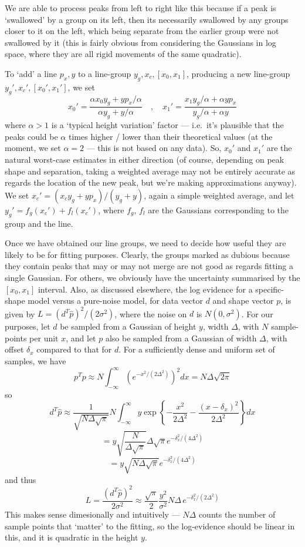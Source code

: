 We are able to process peaks from left to right like this because if
a peak is `swallowed' by a group on its left, then its necessarily
swallowed by any groups closer to it on the left, which being separate
from the earlier group were not swallowed by it (this is fairly obvious
from considering the Gaussians in log space, where they are all rigid
movements of the same quadratic).


To `add' a line $p_x, y$ to a line-group $y_g, x_c, [x_0, x_1]$, producing
a new line-group $y_g', x_c', [x_0', x_1']$, we set
\[
x_0' = \frac{\alpha x_0 y_g + y p_x / \alpha}{\alpha y_g + y/\alpha}
\quad , \quad
x_1' = \frac{x_1 y_g/\alpha + \alpha y p_x}{y_g/\alpha +\alpha y}
\]
where $\alpha > 1$ is a `typical height variation' factor --- i.e.\ it's
plausible that the peaks could be $\alpha$ times higher / lower than
their theoretical values (at the moment, we set $\alpha = 2$ --- this is
not based on any data). So, $x_0'$ and $x_1'$ are the natural worst-case
estimates in either direction (of course, depending on peak shape and separation,
taking a weighted average may not be entirely accurate as regards the location
of the new peak, but we're making approximations anyway).
We set $x_c' = (x_c y_g + y p_x)/(y_g + y)$, again a simple weighted average,
and let $y_g' = f_g (x_c') + f_l (x_c')$, where $f_g$, $f_l$ are the Gaussians
corresponding to the group and the line.


Once we have obtained our line groups, we need to decide how useful they are
likely to be for fitting purposes. Clearly, the groups marked as dubious
because they contain peaks that may or may not merge are not good as regards
fitting a single Gaussian. For others, we obviously have the uncertainty
summarised by the $[x_0, x_1]$ interval. Also, as discussed elsewhere,
the log evidence for a specific-shape model versus a pure-noise
model, for data vector $d$ and shape vector $p$, is given by $L = (d^T 
\hat p)^2 / (2 \sigma^2)$, where the noise on $d$ is $N(0, \sigma^2)$. 
For our purposes, let $d$ be sampled from a Gaussian of height $y$,
width $\Delta$, with $N$ sample-points per unit $x$,
and let $p$ also be sampled from a Gaussian of width $\Delta$, with
offset $\delta_x$ compared to that for $d$. 
For a sufficiently dense and uniform set of samples, we have 
\[
p^T p \approx N \int_{-\infty}^\infty \left(
e^{-x^2 / (2 \Delta^2)} \right)^2
 dx
= N \Delta \sqrt{2 \pi}
\]
so
\[
d^T \hat p \approx \frac{1}{\sqrt{N \Delta \sqrt{\pi}}} N
\int_{-\infty}^\infty
y \exp\left\{-\frac{x^2}{2 \Delta^2} - \frac{(x-\delta_x)^2}{2 \Delta^2}\right\} dx
\]
\[
= y \sqrt{\frac{N}{\Delta \sqrt{\pi}}} \Delta \sqrt\pi e^{-\delta_x^2 / (4 \Delta^2)}
\]
\[
= y \sqrt{N \Delta \sqrt\pi} e^{-\delta_x^2 / (4 \Delta^2)}
\]
and thus
\[
L = \frac{(d^T \hat p)^2}{2 \sigma^2} \approx 
\frac{\sqrt \pi}{2} \frac{y^2}{\sigma^2} N \Delta  \,
 e^{- \delta_x^2 / (2 \Delta^2)} 
\]
This makes sense dimesionally and intuitively --- $N \Delta$ counts the number
of sample points that `matter' to the fitting, so the log-evidence should be linear
in this, and it is quadratic in the height $y$.


